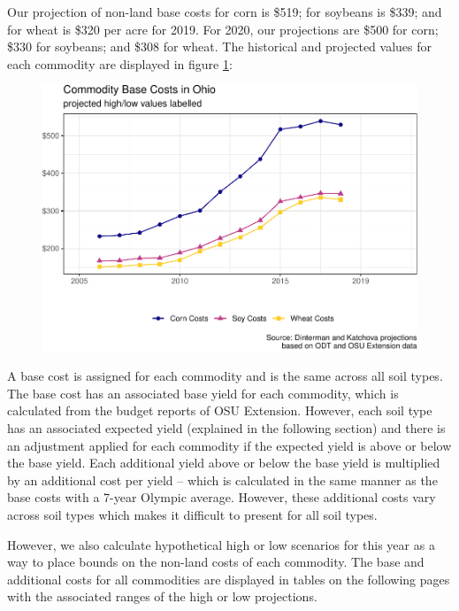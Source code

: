 \documentclass[]{article}
\begin{document}
Our projection of non-land base costs for corn is \$519; for soybeans is
\$339; and for wheat is \$320 per acre for 2019. For 2020, our
projections are \$500 for corn; \$330 for soybeans; and \$308 for wheat.
The historical and projected values for each commodity are displayed in
figure \ref{fig:viz-nonland}:

\begin{figure}[H]
\includegraphics[width=1\linewidth]{4-projections-2019-2020_files/figure-latex/viz-nonland-1} \caption{\label{fig:viz-nonland}}\label{fig:viz-nonland}
\end{figure}

A base cost is assigned for each commodity and is the same across all
soil types. The base cost has an associated base yield for each
commodity, which is calculated from the budget reports of OSU Extension.
However, each soil type has an associated expected yield (explained in
the following section) and there is an adjustment applied for each
commodity if the expected yield is above or below the base yield. Each
additional yield above or below the base yield is multiplied by an
additional cost per yield -- which is calculated in the same manner as
the base costs with a 7-year Olympic average. However, these additional
costs vary across soil types which makes it difficult to present for all
soil types.

However, we also calculate hypothetical high or low scenarios for this
year as a way to place bounds on the non-land costs of each commodity.
The base and additional costs for all commodities are displayed in
tables on the following pages with the associated ranges of the high or
low projections.
\end{document}
